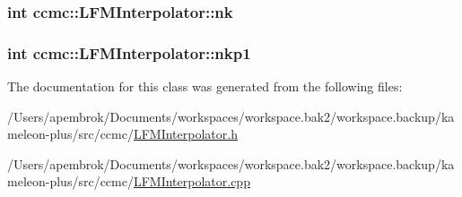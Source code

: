 \hypertarget{classccmc_1_1_l_f_m_interpolator_a5bd5a51d1dc53c2b9b0612ef1b1ab16f}{
\subsubsection[{nk}]{\setlength{\rightskip}{0pt plus 5cm}int ccmc\-::\-L\-F\-M\-Interpolator\-::nk}}\label{classccmc_1_1_l_f_m_interpolator_a5bd5a51d1dc53c2b9b0612ef1b1ab16f}
\hypertarget{classccmc_1_1_l_f_m_interpolator_a4f205cc413dcbb003175d4ac88d353c4}{
\subsubsection[{nkp1}]{\setlength{\rightskip}{0pt plus 5cm}int ccmc\-::\-L\-F\-M\-Interpolator\-::nkp1}}\label{classccmc_1_1_l_f_m_interpolator_a4f205cc413dcbb003175d4ac88d353c4}


The documentation for this class was generated from the following files\-:\begin{DoxyCompactItemize}
\item 
/\-Users/apembrok/\-Documents/workspaces/workspace.\-bak2/workspace.\-backup/kameleon-\/plus/src/ccmc/\hyperlink{_l_f_m_interpolator_8h}{L\-F\-M\-Interpolator.\-h}\item 
/\-Users/apembrok/\-Documents/workspaces/workspace.\-bak2/workspace.\-backup/kameleon-\/plus/src/ccmc/\hyperlink{_l_f_m_interpolator_8cpp}{L\-F\-M\-Interpolator.\-cpp}\end{DoxyCompactItemize}
